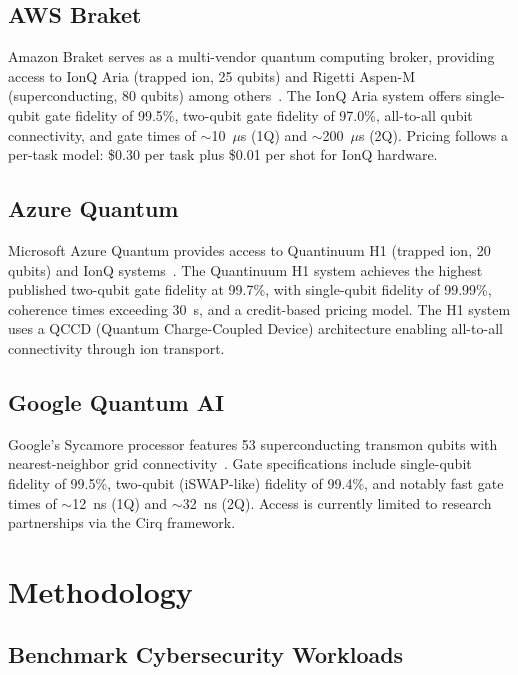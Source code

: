 \documentclass[conference]{IEEEtran}
\begin{document}
\subsection{AWS Braket}

Amazon Braket serves as a multi-vendor quantum computing broker, providing access to IonQ Aria (trapped ion, 25 qubits) and Rigetti Aspen-M (superconducting, 80 qubits) among others~\cite{aws2023braket}. The IonQ Aria system offers single-qubit gate fidelity of 99.5\%, two-qubit gate fidelity of 97.0\%, all-to-all qubit connectivity, and gate times of $\sim$10~$\mu$s (1Q) and $\sim$200~$\mu$s (2Q). Pricing follows a per-task model: \$0.30 per task plus \$0.01 per shot for IonQ hardware.

\subsection{Azure Quantum}

Microsoft Azure Quantum provides access to Quantinuum H1 (trapped ion, 20 qubits) and IonQ systems~\cite{azure2023quantum}. The Quantinuum H1 system achieves the highest published two-qubit gate fidelity at 99.7\%, with single-qubit fidelity of 99.99\%, coherence times exceeding 30~s, and a credit-based pricing model. The H1 system uses a QCCD (Quantum Charge-Coupled Device) architecture enabling all-to-all connectivity through ion transport.

\subsection{Google Quantum AI}

Google's Sycamore processor features 53 superconducting transmon qubits with nearest-neighbor grid connectivity~\cite{arute2019quantum}. Gate specifications include single-qubit fidelity of 99.5\%, two-qubit (iSWAP-like) fidelity of 99.4\%, and notably fast gate times of $\sim$12~ns (1Q) and $\sim$32~ns (2Q). Access is currently limited to research partnerships via the Cirq framework.

\section{Methodology}

\subsection{Benchmark Cybersecurity Workloads}
\end{document}
